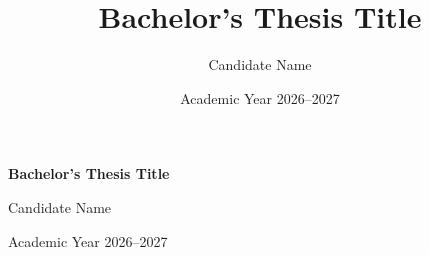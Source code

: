 \documentclass[12pt,a4paper]{report}
\title{Bachelor's Thesis Title}
\author{Candidate Name}
\date{Academic Year 2026--2027}
\begin{document}
\begin{titlepage}
  \centering
  \unifilogo[height=1.5cm]
  \vfill
  {\LARGE\bfseries Bachelor's Thesis Title\par}
  \vspace{1cm}
  {\large Candidate Name\par}
  \vfill
  {\large Academic Year 2026--2027\par}
\end{titlepage}


\end{document}
